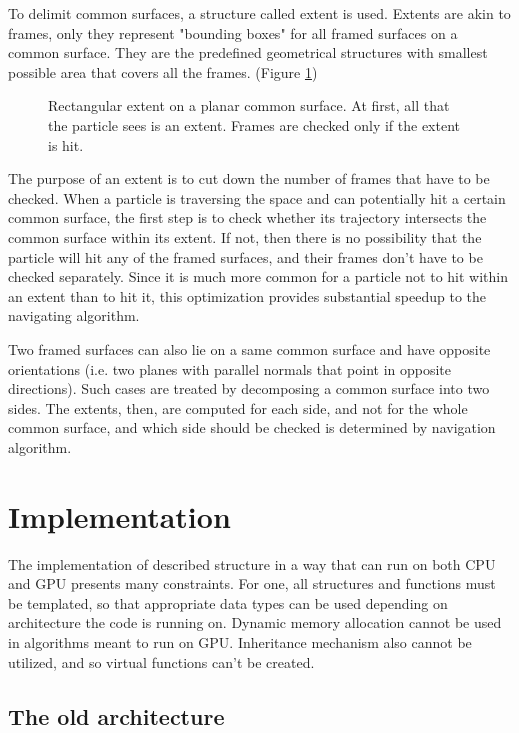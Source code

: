 \documentclass[12pt, a4paper]{article}
\begin{document}
To delimit common surfaces, a structure called extent is used. Extents are akin to frames, only they represent "bounding boxes" for all framed surfaces on a common surface. They are the predefined geometrical structures with smallest possible area that covers all the frames. (Figure \ref{fig:extent})
\begin{figure}[h]
	\centering
	
	\caption{Rectangular extent on a planar common surface. At first, all that the particle sees is an extent. Frames are checked only if the extent is hit.}
	\label{fig:extent}
\end{figure}

The purpose of an extent is to cut down the number of frames that have to be checked. When a particle is traversing the space and can potentially hit a certain common surface, the first step is to check whether its trajectory intersects the common surface within its extent. If not, then there is no possibility that the particle will hit any of the framed surfaces, and their frames don't have to be checked separately. Since it is much more common for a particle not to hit within an extent than to hit it, this optimization provides substantial speedup to the navigating algorithm.

Two framed surfaces can also lie on a same common surface and have opposite orientations (i.e. two planes with parallel normals that point in opposite directions). Such cases are treated by decomposing a common surface into two sides. The extents, then, are computed for each side, and not for the whole common surface, and which side should be checked is determined by navigation algorithm.


\section{Implementation}

The implementation of described structure in a way that can run on both CPU and GPU presents many constraints. For one, all structures and functions must be templated, so that appropriate data types can be used depending on architecture the code is running on. Dynamic memory allocation cannot be used in algorithms meant to run on GPU. Inheritance mechanism also cannot be utilized, and so virtual functions can't be created.


\subsection{The old architecture}
\end{document}
